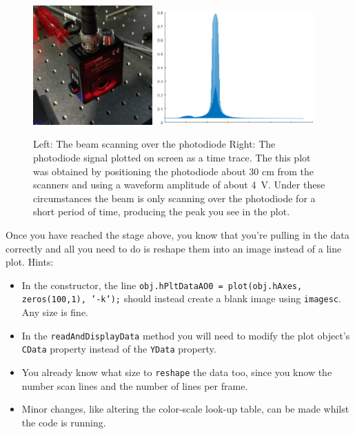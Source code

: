 \documentclass[a4paper]{report}
\begin{document}
\begin{figure}[h]
\centering
\includegraphics[width=1.8in]{BeamScanningOverPhotoDiode.png}
\includegraphics[width=2.4in]{photodiode_lineTrace.png}
\caption{Left: The beam scanning over the photodiode
         Right: The photodiode signal plotted on screen as a time trace.
         The this plot was obtained by positioning the photodiode about 30 cm from the scanners and using a waveform amplitude of about 4~V. 
         Under these circumstances the beam is only scanning over the photodiode for a short period of time, producing the peak you see in the plot. }
\label{lineOnPD}
\end{figure}

\noindent
Once you have reached the stage above, you know that you're pulling in the data correctly and all you need to do is reshape them into an image instead of a line plot.
Hints:
\begin{itemize}
    \setlength\itemsep{0.15em}
    \item In the constructor, the line \texttt{obj.hPltDataAO0 = plot(obj.hAxes, zeros(100,1), '-k');} should instead create a blank image using \texttt{imagesc}. Any size is fine.
    \item In the \texttt{readAndDisplayData} method you will need to modify the plot object's \texttt{CData} property instead of the \texttt{YData} property. 
    \item You already know what size to \texttt{reshape} the data too, since you know the number scan lines and the number of lines per frame.
    \item Minor changes, like altering the color-scale look-up table, can be made whilst the code is running.
\end{itemize}
\end{document}
